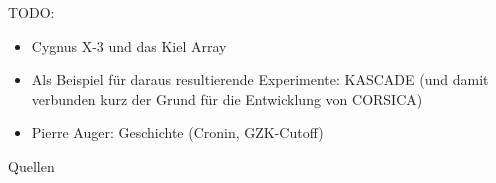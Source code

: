 \documentclass[aspectratio=1610, professionalfonts, 9pt, hyperref={colorlinks=false}]{beamer}
\begin{document}
\begin{frame}{}
TODO:
      \begin{itemize}
        \item Cygnus X-3 und das Kiel Array
        \item Als Beispiel für daraus resultierende Experimente: KASCADE (und damit verbunden kurz der Grund für die Entwicklung von CORSICA)
        \item Pierre Auger: Geschichte (Cronin, GZK-Cutoff)
      \end{itemize}

\end{frame}

\appendix

\begin{frame}[allowframebreaks]{Quellen}
	\printbibliography

\end{frame}
\end{document}
